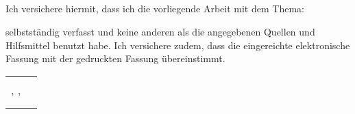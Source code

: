 \begin{center}
	\section*{\declarationHeading}
\end{center}

\noindent Ich versichere hiermit, dass ich die vorliegende Arbeit mit dem Thema: \\

\begin{center}
	\thesisTitle
\end{center}

\noindent selbstständig verfasst und keine anderen als die angegebenen Quellen und Hilfsmittel benutzt habe. Ich versichere zudem, dass die eingereichte elektronische Fassung mit der gedruckten Fassung übereinstimmt.

\vspace*{1.8cm}

\begin{tabular}{l c}
	\noindent \declarationLocation, \declarationDate,	 & \noindent\rule{9cm}{0.5pt} \\ & \name \\
\end{tabular} 